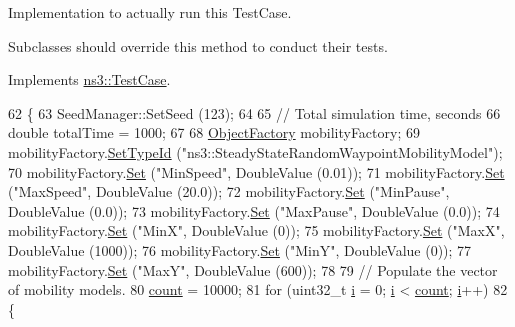 Implementation to actually run this Test\+Case. 

Subclasses should override this method to conduct their tests. 

Implements \hyperlink{classns3_1_1TestCase_a8ff74680cf017ed42011e4be51917a24}{ns3\+::\+Test\+Case}.


\begin{DoxyCode}
62 \{
63   SeedManager::SetSeed (123);
64 
65   \textcolor{comment}{// Total simulation time, seconds}
66   \textcolor{keywordtype}{double} totalTime = 1000;
67 
68   \hyperlink{classns3_1_1ObjectFactory}{ObjectFactory} mobilityFactory;
69   mobilityFactory.\hyperlink{classns3_1_1ObjectFactory_a77dcd099064038a1eb7a6b8251229ec3}{SetTypeId} (\textcolor{stringliteral}{"ns3::SteadyStateRandomWaypointMobilityModel"});
70   mobilityFactory.\hyperlink{classns3_1_1ObjectFactory_aef5c0d5019c96bdf01cefd1ff83f4a68}{Set} (\textcolor{stringliteral}{"MinSpeed"}, DoubleValue (0.01));
71   mobilityFactory.\hyperlink{classns3_1_1ObjectFactory_aef5c0d5019c96bdf01cefd1ff83f4a68}{Set} (\textcolor{stringliteral}{"MaxSpeed"}, DoubleValue (20.0));
72   mobilityFactory.\hyperlink{classns3_1_1ObjectFactory_aef5c0d5019c96bdf01cefd1ff83f4a68}{Set} (\textcolor{stringliteral}{"MinPause"}, DoubleValue (0.0));
73   mobilityFactory.\hyperlink{classns3_1_1ObjectFactory_aef5c0d5019c96bdf01cefd1ff83f4a68}{Set} (\textcolor{stringliteral}{"MaxPause"}, DoubleValue (0.0));
74   mobilityFactory.\hyperlink{classns3_1_1ObjectFactory_aef5c0d5019c96bdf01cefd1ff83f4a68}{Set} (\textcolor{stringliteral}{"MinX"}, DoubleValue (0));
75   mobilityFactory.\hyperlink{classns3_1_1ObjectFactory_aef5c0d5019c96bdf01cefd1ff83f4a68}{Set} (\textcolor{stringliteral}{"MaxX"}, DoubleValue (1000));
76   mobilityFactory.\hyperlink{classns3_1_1ObjectFactory_aef5c0d5019c96bdf01cefd1ff83f4a68}{Set} (\textcolor{stringliteral}{"MinY"}, DoubleValue (0));
77   mobilityFactory.\hyperlink{classns3_1_1ObjectFactory_aef5c0d5019c96bdf01cefd1ff83f4a68}{Set} (\textcolor{stringliteral}{"MaxY"}, DoubleValue (600));
78 
79   \textcolor{comment}{// Populate the vector of mobility models.}
80   \hyperlink{classSteadyStateRandomWaypointTest_a48ac9d867be62c0407cbf2e8c3ad5e1b}{count} = 10000;
81   \textcolor{keywordflow}{for} (uint32\_t \hyperlink{bernuolliDistribution_8m_a6f6ccfcf58b31cb6412107d9d5281426}{i} = 0; \hyperlink{bernuolliDistribution_8m_a6f6ccfcf58b31cb6412107d9d5281426}{i} < \hyperlink{classSteadyStateRandomWaypointTest_a48ac9d867be62c0407cbf2e8c3ad5e1b}{count}; \hyperlink{bernuolliDistribution_8m_a6f6ccfcf58b31cb6412107d9d5281426}{i}++)
82     \{

\end{DoxyCode}
